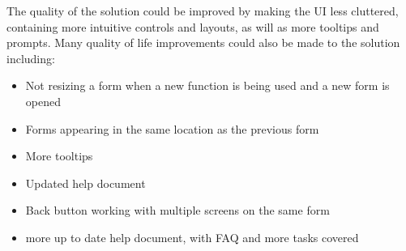 \documentclass[oneside,openany,11pt,a4paper]{report}
\begin{document}
The quality of the solution could be improved by making the UI less cluttered, containing more intuitive controls and layouts, as will as more tooltips and prompts. Many quality of life improvements could also be made to the solution including:
	
	\begin{itemize}
	\itemsep0em
	\item Not resizing a form when a new function is being used and a new form is opened
	\item Forms appearing in the same location as the previous form
	\item More tooltips
	\item Updated help document
	\item Back button working with multiple screens on the same form
	\item more up to date help document, with FAQ and more tasks covered
\end{itemize} 
	
	
	
	
	
	
	
\end{document}
